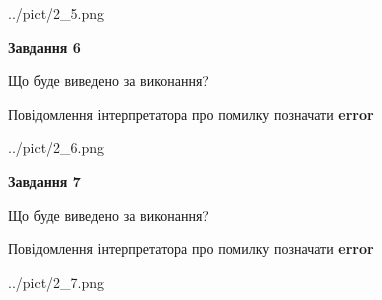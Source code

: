 \documentclass[10pt, ukrainian]{article}
\begin{document}
{\begin {large}
\begin{center}
	{../pict/2_5.png}
\end{center}
\newpage

{\begin {center}\textbf{Завдання 6}\end {center}}\par
Що буде виведено за виконання? \par
Повідомлення інтерпретатора про помилку позначати \textbf{error}

\begin{center}
	{../pict/2_6.png}
\end{center}
\newpage

{\begin {center}\textbf{Завдання 7}\end {center}}\par
Що буде виведено за виконання? \par
Повідомлення інтерпретатора про помилку позначати \textbf{error}

\begin{center}
	{../pict/2_7.png}
\end{center}
\newpage

\end {large}}
\end{document}

